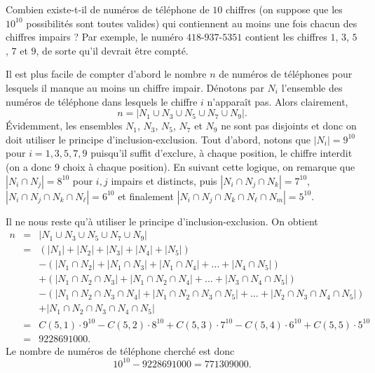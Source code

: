 \documentclass[12pt,addpoints]{exam}
\begin{document}
\begin{questions}
\question
Combien existe-t-il de numéros de téléphone de $10$ chiffres (on suppose que les $10^{10}$ possibilités sont toutes valides) qui contiennent au moins une fois chacun des chiffres impairs ? Par exemple, le numéro $418$-$937$-$5351$ contient les chiffres $1$, $3$, $5$, $7$ et $9$, de sorte qu'il devrait être compté.
\begin{solution}
Il est plus facile de compter d'abord le nombre $n$ de numéros de téléphones pour lesquels il manque au moins un chiffre impair. Dénotons par $N_i$ l'ensemble des numéros de téléphone dans lesquels le chiffre $i$ n'apparaît pas. Alors clairement, 
$$n = \left| N_1 \cup N_3 \cup N_5 \cup N_7 \cup N_9 \right|.$$
Évidemment, les ensembles $N_1$, $N_3$, $N_5$, $N_7$ et $N_9$ ne sont pas disjoints et donc on doit utiliser le principe d'inclusion-exclusion. Tout d'abord, notons que $|N_i| = 9^{10}$ pour $i = 1,3,5,7,9$ puisqu'il suffit d'exclure, à chaque position, le chiffre interdit (on a donc $9$ choix à chaque position). En suivant cette logique, on remarque que $|N_i \cap N_j| = 8^{10}$ pour $i,j$ impairs et distincts, puis $|N_i \cap N_j \cap N_k| = 7^{10}$, $|N_i \cap N_j \cap N_k \cap N_\ell| = 6^{10}$ et finalement $|N_i \cap N_j \cap N_k \cap N_\ell \cap N_m| = 5^{10}$.

Il ne nous reste qu'à utiliser le principe d'inclusion-exclusion. On obtient
\begin{eqnarray*}
  n & = & \left| N_1 \cup N_3 \cup N_5 \cup N_7 \cup N_9 \right| \\
    & = & (|N_1| + |N_2| + |N_3| + |N_4| + |N_5|) \\
    &   & - (|N_1 \cap N_2| + |N_1 \cap N_3| + |N_1 \cap N_4| + \ldots + |N_4 \cap N_5|) \\
    &   & + (|N_1 \cap N_2 \cap N_3| + |N_1 \cap N_2 \cap N_4| + \ldots + |N_3 \cap N_4 \cap N_5|) \\
    &   & - (|N_1 \cap N_2 \cap N_3 \cap N_4| + |N_1 \cap N_2 \cap N_3 \cap N_5| + \ldots + |N_2 \cap N_3 \cap N_4 \cap N_5|) \\
    &   & + |N_1 \cap N_2 \cap N_3 \cap N_4 \cap N_5| \\
    & = & C(5,1) \cdot 9^{10} - C(5,2) \cdot 8^{10} + C(5,3) \cdot 7^{10} - C(5,4) \cdot 6^{10} + C(5,5) \cdot 5^{10} \\
    & = & 9228691000.
\end{eqnarray*}
Le nombre de numéros de téléphone cherché est donc
$$10^{10} - 9228691000 = 771309000.$$
\end{solution}


\end{questions}
\end{document}
